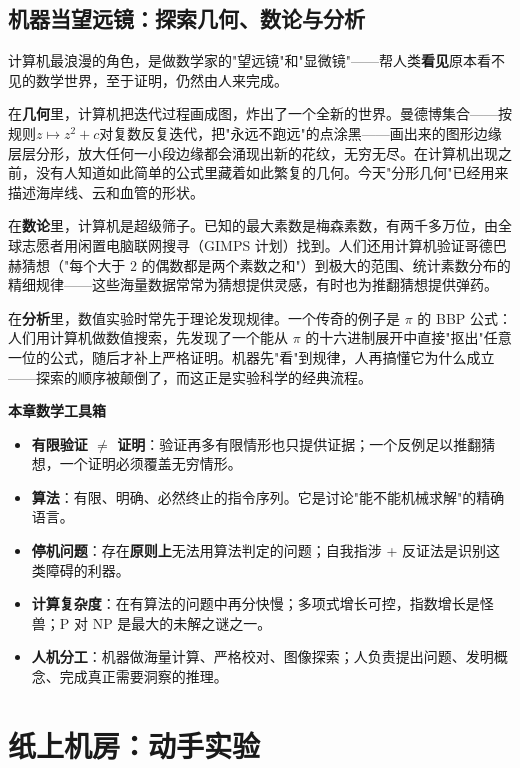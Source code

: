 \subsection{机器当望远镜：探索几何、数论与分析}

计算机最浪漫的角色，是做数学家的"望远镜"和"显微镜"——帮人类\textbf{看见}原本看不见的数学世界，至于证明，仍然由人来完成。

在\textbf{几何}里，计算机把迭代过程画成图，炸出了一个全新的世界。曼德博集合——按规则$z \mapsto z^2 + c$对复数反复迭代，把"永远不跑远"的点涂黑——画出来的图形边缘层层分形，放大任何一小段边缘都会涌现出新的花纹，无穷无尽。在计算机出现之前，没有人知道如此简单的公式里藏着如此繁复的几何。今天"分形几何"已经用来描述海岸线、云和血管的形状。

在\textbf{数论}里，计算机是超级筛子。已知的最大素数是梅森素数，有两千多万位，由全球志愿者用闲置电脑联网搜寻（GIMPS 计划）找到。人们还用计算机验证哥德巴赫猜想（"每个大于 $2$ 的偶数都是两个素数之和"）到极大的范围、统计素数分布的精细规律——这些海量数据常常为猜想提供灵感，有时也为推翻猜想提供弹药。

在\textbf{分析}里，数值实验时常先于理论发现规律。一个传奇的例子是 $\pi$ 的 BBP 公式：人们用计算机做数值搜索，先发现了一个能从 $\pi$ 的十六进制展开中直接"抠出"任意一位的公式，随后才补上严格证明。机器先"看"到规律，人再搞懂它为什么成立——探索的顺序被颠倒了，而这正是实验科学的经典流程。

\begin{toolbox}
\textbf{本章数学工具箱}

\begin{itemize}
\item \textbf{有限验证 $\neq$ 证明}：验证再多有限情形也只提供证据；一个反例足以推翻猜想，一个证明必须覆盖无穷情形。
\item \textbf{算法}：有限、明确、必然终止的指令序列。它是讨论"能不能机械求解"的精确语言。
\item \textbf{停机问题}：存在\textbf{原则上}无法用算法判定的问题；自我指涉 + 反证法是识别这类障碍的利器。
\item \textbf{计算复杂度}：在有算法的问题中再分快慢；多项式增长可控，指数增长是怪兽；P 对 NP 是最大的未解之谜之一。
\item \textbf{人机分工}：机器做海量计算、严格校对、图像探索；人负责提出问题、发明概念、完成真正需要洞察的推理。
\end{itemize}
\end{toolbox}

\section{纸上机房：动手实验}

